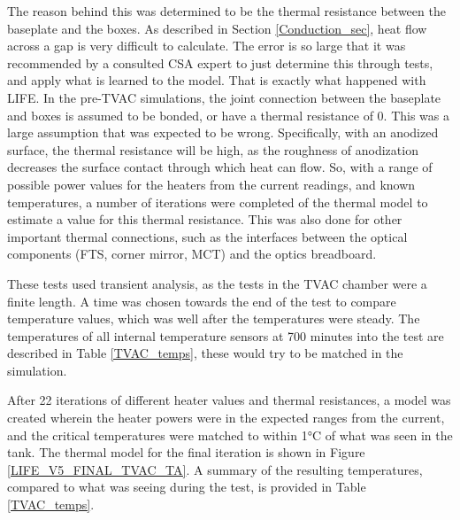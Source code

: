 The reason behind this was determined to be the thermal resistance between the baseplate and the boxes. As described in Section \ref{Conduction_sec}, heat flow across a gap is very difficult to calculate. The error is so large that it was recommended by a consulted CSA expert to just determine this through tests, and apply what is learned to the model. That is exactly what happened with LIFE. In the pre-TVAC simulations, the joint connection between the baseplate and boxes is assumed to be bonded, or have a thermal resistance of 0. This was a large assumption that was expected to be wrong. Specifically, with an anodized surface, the thermal resistance will be high, as the roughness of anodization decreases the surface contact through which heat can flow. So, with a range of possible power values for the heaters from the current readings, and known temperatures, a number of iterations were completed of the thermal model to estimate a value for this thermal resistance. This was also done for other important thermal connections, such as the interfaces between the optical components (FTS, corner mirror, MCT) and the optics breadboard.

These tests used transient analysis, as the tests in the TVAC chamber were a finite length. A time was chosen towards the end of the test to compare temperature values, which was well after the temperatures were steady. The temperatures of all internal temperature sensors at 700 minutes into the test are described in Table \ref{TVAC_temps}, these would try to be matched in the simulation. 

After 22 iterations of different heater values and thermal resistances, a model was created wherein the heater powers were in the expected ranges from the current, and the critical temperatures were matched to within 1°C of what was seen in the tank. The thermal model for the final iteration is shown in Figure \ref{LIFE_V5_FINAL_TVAC_TA}. A summary of the resulting temperatures, compared to what was seeing during the test, is provided in Table \ref{TVAC_temps}.

